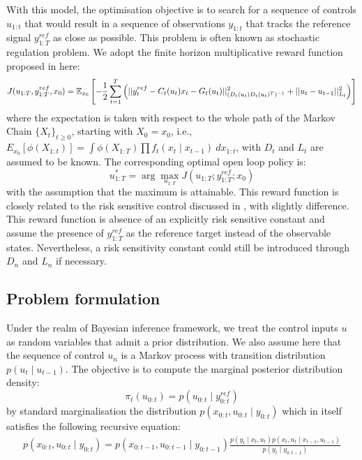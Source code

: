 With this model, the optimisation objective is to search for a sequence of controls $u_{1:t}$ that would result in a sequence of observations $y_{1:t}$ that tracks the reference signal $y^{ref}_{1:T}$ as close as possible. This problem is often known as stochastic regulation problem. We adopt the finite horizon multiplicative reward function proposed in \cite{NK11} here:
\begin{equation}
  J(u_{1:T},y^{ref}_{1:T}, x_0) = \operatorname{\mathbb{E}}_{x_0}\left[ -\dfrac{1}{2}\displaystyle\sum^T_{t=1}\left(\vert\vert y^{ref}_t - C_t(u_t)x_t - G_t(u_t) \vert\vert^2_{(D_t(u_t)D_t(u_t)^T)^{-1}}  + \vert\vert u_t - u_{t-1} \vert\vert^2_{L_t}\right) \right]
\end{equation}
where the expectation is taken with respect to the whole path of the Markov Chain $\{X_t\}_{t \geq 0}$, starting with $X_0 = x_0$,  i.e., $E_{x_0}[\phi(X_{1:t})] = \displaystyle\int \phi(X_{1:T}) \prod f_t(x_t \mid x_{t-1})~dx_{1:t}$, with $D_t$ and $L_t$ are assumed to be known. The corresponding optimal open loop policy is:
\begin{equation}
  u^*_{1:T} = \arg\max_{u_{1:T}} J(u_{1:T};y^{ref}_{1:T};x_0)
\label{eq:optcontrol}
\end{equation}
with the assumption that the maximum is attainable. This reward function is closely related to the risk sensitive control discussed in \cite{WR90}, with slightly difference. This reward function is absence of an explicitly risk sensitive constant and assume the presence of $y^{ref}_{1:T}$ as the reference target instead of the observable states. Nevertheless, a risk sensitivity constant could still be introduced through $D_n$ and $L_n$ if necessary.

\subsection{Problem formulation}
Under the realm of Bayesian inference framework, we treat the control inputs $u$ as random variables that admit a prior distribution. We also assume here that the sequence of control $u_n$ is a Markov process with transition distribution $p(u_t \mid u_{t-1})$. The objective is to compute the marginal posterior distribution density:
\begin{equation}
 \pi_t(u_{0:t}) = p(u_{0:t} \mid y^{ref}_{0:t})
\end{equation} 
by standard marginalisation the distribution $p(x_{0:t}, u_{0:t} \mid y_{0:t})$ which in itself satisfies the following recursive equation:
\begin{align}
  p(x_{0:t}, u_{0:t} \mid y_{0:t}) = p(x_{0:t-1}, u_{0:t-1} \mid y_{0:t-1}) \frac{p(y_t \mid x_t, u_t)p(x_t, u_t \mid x_{t-1}, u_{t-1})}{p(y_t \mid y_{0:t-1})}
\end{align}
 

